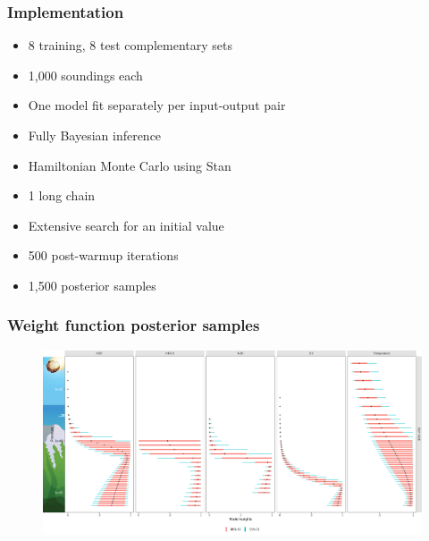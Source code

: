 \documentclass[aspectratio=169,t,xcolor=table]{beamer}
\newcommand\myHearts[1]{
  {
    \setbeamercolor{background canvas}{bg=ISUcardinal}
    \setbeamercolor{normal text}{fg=ISUgold}
    \begin{frame}
      \begin{tikzpicture}[overlay, remember picture]
	\node[anchor=center] at (current page.center) {
	  \begin{beamercolorbox}[center]{title}
	    \Huge
	    \color{ISUgold}
	    #1
	  \end{beamercolorbox}};
      \end{tikzpicture}
    \end{frame}
  }
}
\begin{document}

\begin{frame}
  \frametitle{Implementation}
  \begin{itemize}
  \item 8 training, 8 test complementary sets
  \item 1,000 soundings each
  \item One model fit separately per input-output pair
  \item Fully Bayesian inference
  \item Hamiltonian Monte Carlo using Stan
  \item 1 long chain
  \item Extensive search for an initial value
  \item 500 post-warmup iterations
  \item 1,500 posterior samples
  \end{itemize}
\end{frame}

\begin{frame}
  \frametitle{Weight function posterior samples}

  \begin{figure}
    \centering
    \includegraphics[width=1\textwidth]{image2934-8.png}
  \end{figure}
\end{frame}


\end{document}
